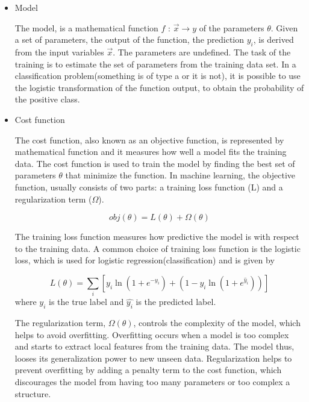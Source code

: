 \begin{itemize}
\item Model
\label{sec:org9267753}

The model, is a mathematical function \(f\text{ : } \vec{x} \rightarrow y\) of the parameters \(\theta\). Given a set of parameters, the output of the function, the prediction \(y_{i}\), is derived from the input variables \(\vec{x}\).
The parameters are undefined. The task of the training is to estimate the set of parameters from the training data set.
In a classification problem(something is of type a or it is not), it is possible to use the logistic transformation of the function output, to obtain the probability of the positive class.

\item Cost function
\label{sec:org4bc322f}

The cost function, also known as an objective function, is represented by mathematical function and it measures how well a model fits the training data. The cost function is used to train the model by finding the best set of parameters \(\theta\) that minimize the function.
In machine learning, the objective function, usually consists of two parts: a training loss function (L) and a regularization term (\(\Omega\)).

\begin{equation}
obj(\theta) = L(\theta) + \Omega(\theta)
\end{equation}

The training loss function measures how predictive the model is with respect to the training data. A common choice of training loss function is the logistic loss, which is used for logistic regression(classification) and is given by

\begin{equation}
L(\theta) = \sum_{i}[ y_{i}\ln(1+e^{-\hat{y_{i}}})+(1-y_{i}\ln(1+e^{\hat{y}_{i}}))]
\end{equation}
where \(y_{i}\) is the true label and \(\hat{y_{i}}\) is the predicted label.

The regularization term, \(\Omega(\theta)\), controls the complexity of the model, which helps to avoid overfitting. Overfitting occurs when a model is too complex and starts to extract local features from the training data. The model thus, looses its generalization power to new unseen data. Regularization helps to prevent overfitting by adding a penalty term to the cost function, which discourages the model from having too many parameters or too complex a structure.


\end{itemize}
